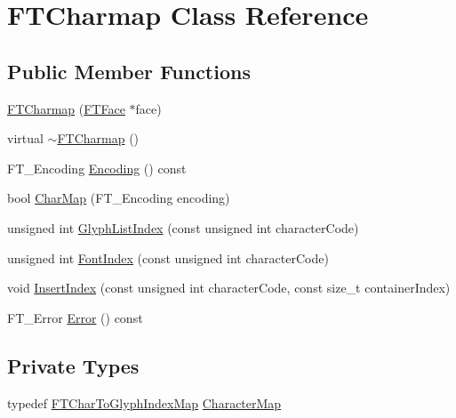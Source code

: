 \hypertarget{class_f_t_charmap}{}\section{F\+T\+Charmap Class Reference}
\label{class_f_t_charmap}
\subsection*{Public Member Functions}
\begin{DoxyCompactItemize}
\item 
\hyperlink{class_f_t_charmap_a9d19837becbc83acf7f56a5980b2b644}{F\+T\+Charmap} (\hyperlink{class_f_t_face}{F\+T\+Face} $\ast$face)
\item 
virtual \hyperlink{class_f_t_charmap_afcbe1e49ed38810e8b9c2e116ddbbffc}{$\sim$\+F\+T\+Charmap} ()
\item 
F\+T\+\_\+\+Encoding \hyperlink{class_f_t_charmap_a4c119ad30110e00b6b3944288a702c84}{Encoding} () const 
\item 
bool \hyperlink{class_f_t_charmap_a4d182b0faeb7198b4f583b84eaf4cd55}{Char\+Map} (F\+T\+\_\+\+Encoding encoding)
\item 
unsigned int \hyperlink{class_f_t_charmap_a6084cc8ab267b9974980e14f17227f25}{Glyph\+List\+Index} (const unsigned int character\+Code)
\item 
unsigned int \hyperlink{class_f_t_charmap_ab77d9f06a9109608b1734010acecaefd}{Font\+Index} (const unsigned int character\+Code)
\item 
void \hyperlink{class_f_t_charmap_a374e41b6f8b07efb08e5c173cc707354}{Insert\+Index} (const unsigned int character\+Code, const size\+\_\+t container\+Index)
\item 
F\+T\+\_\+\+Error \hyperlink{class_f_t_charmap_a176e217e3e837db5fc4592ceff5ed488}{Error} () const 
\end{DoxyCompactItemize}
\subsection*{Private Types}
\begin{DoxyCompactItemize}
\item 
typedef \hyperlink{class_f_t_char_to_glyph_index_map}{F\+T\+Char\+To\+Glyph\+Index\+Map} \hyperlink{class_f_t_charmap_a2dfb7dabf22eb8913cb4614348f5dbe8}{Character\+Map}
\end{DoxyCompactItemize}
